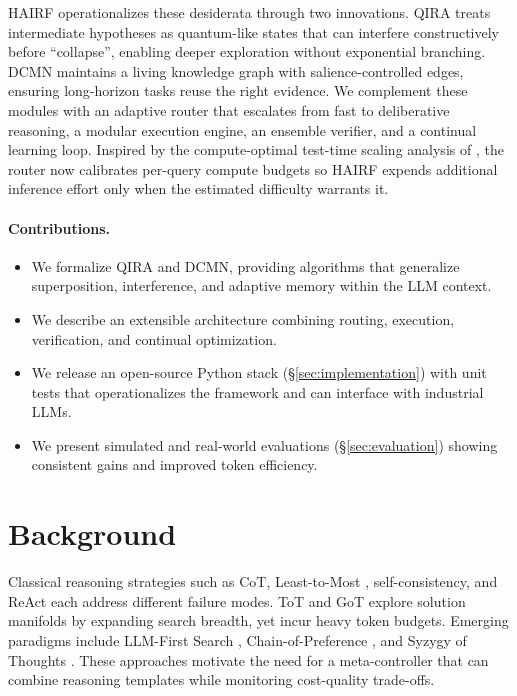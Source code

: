 \documentclass[11pt]{article}
\begin{document}
HAIRF operationalizes these desiderata through two innovations.  QIRA treats intermediate hypotheses as quantum-like states that can interfere constructively before ``collapse'', enabling deeper exploration without exponential branching.  DCMN maintains a living knowledge graph with salience-controlled edges, ensuring long-horizon tasks reuse the right evidence.  We complement these modules with an adaptive router that escalates from fast to deliberative reasoning, a modular execution engine, an ensemble verifier, and a continual learning loop.  Inspired by the compute-optimal test-time scaling analysis of \citet{snell2024scaling}, the router now calibrates per-query compute budgets so HAIRF expends additional inference effort only when the estimated difficulty warrants it.

\paragraph{Contributions.}
\begin{itemize}[leftmargin=*]
    \item We formalize QIRA and DCMN, providing algorithms that generalize superposition, interference, and adaptive memory within the LLM context.
    \item We describe an extensible architecture combining routing, execution, verification, and continual optimization.
    \item We release an open-source Python stack (\S\ref{sec:implementation}) with unit tests that operationalizes the framework and can interface with industrial LLMs.
    \item We present simulated and real-world evaluations (\S\ref{sec:evaluation}) showing consistent gains and improved token efficiency.
\end{itemize}

\section{Background}
\label{sec:background}
Classical reasoning strategies such as CoT, Least-to-Most \citep{zhou2022least}, self-consistency, and ReAct each address different failure modes.  ToT and GoT explore solution manifolds by expanding search breadth, yet incur heavy token budgets.  Emerging paradigms include LLM-First Search \citep{herr2025llmfirst}, Chain-of-Preference \citep{li2024chain}, and Syzygy of Thoughts \citep{smith2025syzygy}.  These approaches motivate the need for a meta-controller that can combine reasoning templates while monitoring cost-quality trade-offs.
\end{document}
